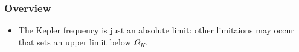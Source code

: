 \begin{frame}
\frametitle{Overview}

\begin{itemize}
	\item The Kepler frequency is just an absolute limit: other limitaions may occur that sets an upper limit below $\Omega_{K}$.
\end{itemize}

\end{frame}